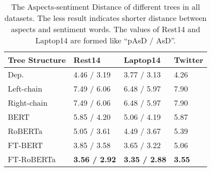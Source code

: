 \documentclass[11pt]{article}
\begin{document}
\begin{table}[h]
  \centering\small
  \setlength\tabcolsep{1pt}
  \begin{tabular}{m{2.2cm}m{1.65cm}<{\centering}m{2cm}<{\centering}m{1.3cm}<{\centering}}
    \toprule
    Tree Structure & Rest14                 & Laptop14               & Twitter       \\
    \midrule
    Dep.           & 4.46 / 3.19            & 3.77 / 3.13            & 4.26          \\
    Left-chain     & 7.49 / 6.06            & 6.48 / 5.97            & 7.90          \\
    Right-chain    & 7.49 / 6.06            & 6.48 / 5.97            & 7.90          \\
    BERT           & 5.85 / 4.20            & 5.06 / 4.19            & 5.87          \\
    RoBERTa        & 5.05 / 3.61            & 4.49 / 3.67            & 5.39          \\
    FT-BERT        & 3.85 / 3.58            & 3.65 / 3.22            & 5.06          \\
    FT-RoBERTa     & \textbf{3.56 / 2.92  } & \textbf{3.35 / 2.88  } & \textbf{3.55} \\
    \bottomrule
  \end{tabular}
  \caption{The Aspects-sentiment Distance of different trees in all datasets. The less result indicates shorter distance between aspects and sentiment words. The values of Rest14 and Laptop14 are formed like ``pAsD / AsD''. }
  \label{tb:dis}
\end{table}
\end{document}
